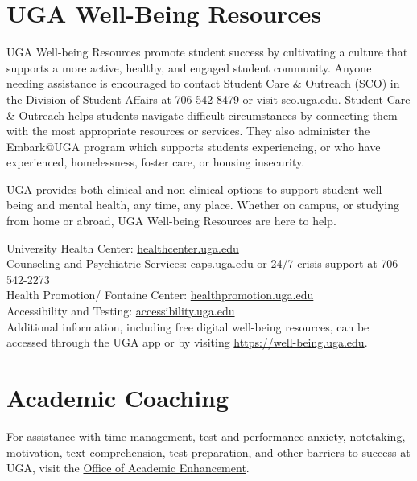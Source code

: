 \documentclass[12pt]{article}
\begin{document}
\section*{\normalsize UGA Well-Being Resources}
\vspace{-4mm}

UGA Well-being Resources promote student success by cultivating a
culture that supports a more active, healthy, and engaged student
community. Anyone needing assistance is encouraged to contact Student
Care \& Outreach (SCO) in the Division of Student Affairs at
706-542-8479 or visit \url{sco.uga.edu}. Student Care \& Outreach
helps students navigate difficult circumstances by connecting them
with the most appropriate resources or services. They also administer
the Embark@UGA program which supports students experiencing, or who
have experienced, homelessness, foster care, or housing insecurity. 

UGA provides both clinical and non-clinical options to support student
well-being and mental health, any time, any place. Whether on campus,
or studying from home or abroad, UGA Well-being Resources are here to
help. 


University Health Center: \url{healthcenter.uga.edu} \\
Counseling and Psychiatric Services: \url{caps.uga.edu} or 24/7
crisis support at 706-542-2273 \\
Health Promotion/ Fontaine Center: \url{healthpromotion.uga.edu} \\
Accessibility and Testing: \url{accessibility.uga.edu} \\
Additional information, including free digital well-being resources,
can be accessed through the UGA app or by visiting
\url{https://well-being.uga.edu}. 


\section*{\normalsize Academic Coaching}
\vspace{-4mm}

For assistance with time management, test and performance anxiety,
notetaking, motivation, text comprehension, test preparation, and
other barriers to success at UGA, visit the
\href{https://dae.uga.edu/services/academic-coaching/}{Office of Academic Enhancement}. 
\end{document}
